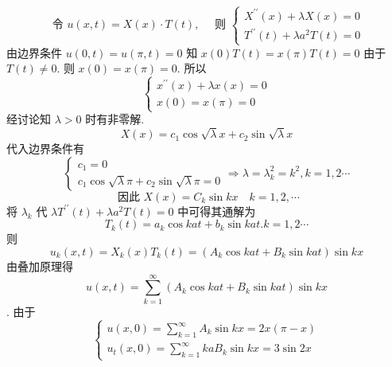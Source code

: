 \begin{questions}
    \begin{solution}
        $$
\text { 令 } u(x, t)=X(x) \cdot T(t), \quad \text { 则 }\left\{\begin{array}{l}
X^{\prime \prime}(x)+\lambda X(x)=0 \\
T^{\prime \prime}(t)+\lambda a^{2} T(t)=0
\end{array}\right.
$$
由边界条件 $ u(0, t)=u(\pi, t)=0 $ 知 $ x(0) T(t)=x(\pi) T(t)=0 $ 由于 $ T(t) \neq 0 $. 则 $ x(0)=x(\pi)=0 $. 所以 
$$\left\{\begin{array}{l}x^{\prime \prime}(x)+\lambda x(x)=0 \\ x(0)=x(\pi)=0\end{array}\right. $$ 
经讨论知 $ \lambda>0 $ 时有非零解.
$$
X(x)=c_{1} \cos \sqrt{\lambda} x+c_{2} \sin \sqrt{\lambda} x
$$
代入边界条件有 
$$ \left\{\begin{array}{l}c_{1}=0 \\ c_{1} \cos \sqrt{\lambda} \pi+c_{2} \sin \sqrt{\lambda} \pi=0\end{array} \Rightarrow \lambda=\lambda_{k}^{2}=k^{2}, k=1,2 \cdots\right. $$
$$
\text { 因此 } X(x)=C_{k} \sin k x \quad k=1,2, \cdots
$$
将 $ \lambda_{k} $ 代 $ \lambda T^{\prime \prime}(t)+\lambda a^{2} T(t)=0 $ 中可得其通解为
$$
T_{k}(t)=a_{k} \cos k a t+b_{k} \sin k a t . k=1,2 \cdots
$$
则 
$$ u_{k}(x, t)=X_{k}(x) T_{k}(t)=\left(A_{k} \cos k a t+B_{k} \sin k a t\right) \sin k x $$ 
由叠加原理得 
$$ u(x, t)=\sum_{k=1}^{\infty}\left(A_{k} \cos k a t+B_{k} \sin k a t\right) \sin k x $$
. 由于 
$$ \left\{\begin{array}{l}u(x, 0)=\sum\limits_{k=1}^{\infty} A_{k} \sin k x=2 x(\pi-x) \\ u_{t}(x, 0)=\sum\limits_{k=1}^{\infty} k a B_{k} \sin k x=3 \sin 2 x\end{array}\right. $$


\end{solution}
\end{questions}
